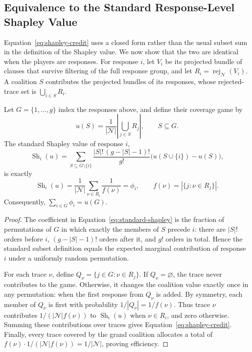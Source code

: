 \subsection{Equivalence to the Standard Response-Level Shapley Value}

Equation~\eqref{eq:shapley-credit} uses a closed form rather than the usual
subset sum in the definition of the Shapley value.  We now show that the two
are identical when the players are responses.  For response \(i\), let \(V_i\)
be its projected bundle of clauses that survive filtering of the full response
group, and let \(R_i=\operatorname{rej}_{\mathcal N}(V_i)\).  A coalition
\(S\) contributes the projected bundles of its responses, whose rejected-trace
set is \(\bigcup_{i\in S}R_i\).

\begin{proposition}
\label{prop:shapley-closed-form}
Let \(G=\{1,\ldots,g\}\) index the responses above, and define their coverage
game by
\[
  u(S)=\frac{1}{|\mathcal N|}\left|\bigcup_{j\in S}R_j\right|,
  \qquad S\subseteq G.
\]
The standard Shapley value of response \(i\),
\begin{equation}
  \operatorname{Sh}_i(u)
  =\sum_{S\subseteq G\setminus\{i\}}
    \frac{|S|!\,(g-|S|-1)!}{g!}
    \bigl(u(S\cup\{i\})-u(S)\bigr),
  \label{eq:standard-shapley}
\end{equation}
is exactly
\[
  \operatorname{Sh}_i(u)
  =\frac{1}{|\mathcal N|}
    \sum_{\nu\in R_i}\frac{1}{f(\nu)}
  =\phi_i,
  \qquad
  f(\nu)=|\{j:\nu\in R_j\}|.
\]
Consequently, \(\sum_{i\in G}\phi_i=u(G)\).
\end{proposition}

\begin{proof}
The coefficient in Equation~\eqref{eq:standard-shapley} is the fraction of
permutations of \(G\) in which exactly the members of \(S\) precede \(i\):
there are \(|S|!\) orders before \(i\), \((g-|S|-1)!\) orders after it, and
\(g!\) orders in total.  Hence the standard subset definition equals the
expected marginal contribution of response \(i\) under a uniformly random
permutation.

For each trace \(\nu\), define
\(Q_\nu=\{j\in G:\nu\in R_j\}\).  If \(Q_\nu=\varnothing\), the trace never
contributes to the game.  Otherwise, it changes the coalition value exactly
once in any permutation: when the first response from \(Q_\nu\) is added.
By symmetry, each member of \(Q_\nu\) is first with probability
\(1/|Q_\nu|=1/f(\nu)\).  Thus trace \(\nu\) contributes
\(1/(|\mathcal N|f(\nu))\) to \(\operatorname{Sh}_i(u)\) when
\(\nu\in R_i\), and zero otherwise.  Summing these contributions over traces
gives Equation~\eqref{eq:shapley-credit}.  Finally, every trace covered by the
grand coalition allocates a total of
\(f(\nu)\cdot 1/(|\mathcal N|f(\nu))=1/|\mathcal N|\), proving efficiency.
\end{proof}


